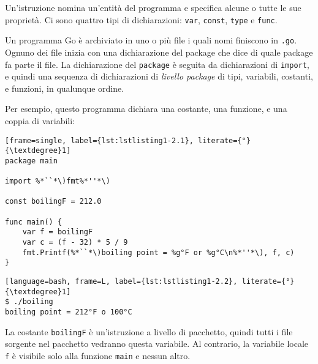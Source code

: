 Un'istruzione nomina un'entità del programma e specifica alcune o tutte le sue proprietà.
Ci sono quattro tipi di dichiarazioni: \verb|var|, \verb|const|, \verb|type| e \verb|func|.

Un programma Go è archiviato in uno o più file i quali nomi finiscono in \verb|.go|.
Ognuno dei file inizia con una dichiarazione del package che dice di quale package fa parte il file.
La dichiarazione del \verb|package| è seguita da dichiarazioni di \verb|import|, e quindi una sequenza di dichiarazioni di \textit{livello package} di tipi, variabili, costanti, e funzioni, in qualunque ordine.

Per esempio, questo programma dichiara una costante, una funzione, e una coppia di variabili:
\begin{lstlisting}[frame=single, label={lst:lstlisting1-2.1}, literate={°}{\textdegree}1]
package main

import %*``*\)fmt%*''*\)

const boilingF = 212.0

func main() {
    var f = boilingF
    var c = (f - 32) * 5 / 9
    fmt.Printf(%*``*\)boiling point = %g°F or %g°C\n%*''*\), f, c)
}
\end{lstlisting}
\begin{lstlisting}[language=bash, frame=L, label={lst:lstlisting1-2.2}, literate={°}{\textdegree}1]
$ ./boiling
boiling point = 212°F o 100°C
\end{lstlisting}
La costante \verb|boilingF| è un'istruzione a livello di pacchetto, quindi tutti i file sorgente nel pacchetto vedranno questa variabile.
Al contrario, la variabile locale \verb|f| è visibile solo alla funzione \verb|main| e nessun altro.

